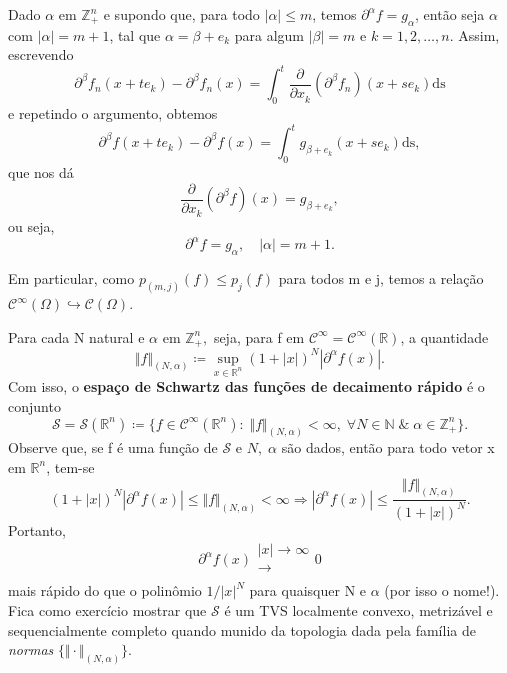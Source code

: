 \documentclass[../distribution_theory_notes.tex]{subfiles}
\begin{document}
\begin{tcolorbox}[
		skin=enhanced,
		title=Observação,
		fonttitle=\bfseries,
		colframe=black,
		colbacktitle=cyan!75!white,
		colback=cyan!15,
		colbacklower=black,
		coltitle=black,
		drop fuzzy shadow,
	]
	Dado \(\alpha \) em \(\mathbb{Z}_{+}^{n}\) e supondo que, para todo \(|\alpha |\leq m\), temos \(\partial^{\alpha }f = g_{\alpha }\), então seja \(\alpha \) com \(|\alpha |=m+1\), tal que \(\alpha = \beta +e_{k}\) para algum \(|\beta |=m\) e \(k = 1,2,\dotsc ,n.\) Assim, escrevendo
	\[
		\partial^{\beta }f_{n}(x+te_{k})-\partial^{\beta }f_{n}(x)=\int_{0}^{t}\frac{\partial^{}}{\partial x_{k}^{}}(\partial^{\beta }f_{n})(x+se_{k}) \mathrm{ds}
	\]
	e repetindo o argumento, obtemos
	\[
		\partial^{\beta }f(x+te_{k})-\partial^{\beta }f(x)=\int_{0}^{t}g_{\beta +e_{k}}(x+se_{k}) \mathrm{ds},
	\]
	que nos dá
	\[
		\frac{\partial^{}}{\partial x_{k}^{}}(\partial^{\beta }f)(x)=g_{\beta+e_{k}},
	\]
	ou seja,
	\[
		\partial^{\alpha }f = g_{\alpha },\quad |\alpha |=m+1.
	\]

	Em particular, como \(p_{(m, j)}(f)\leq p_{j}(f)\) para todos m e j, temos a relação \(\mathcal{C}^{\infty}(\Omega )\hookrightarrow \mathcal{C}(\Omega )\).
\end{tcolorbox}
\begin{example}[O Espaço de Schwartz \(\mathcal{S}=\mathcal{S}(\mathbb{R}^{n})\)]
	Para cada N natural e \(\alpha \) em \(\mathbb{Z}_{+}^{n},\) seja, para f em \(\mathcal{C}^{\infty}=\mathcal{C}^{\infty}(\mathbb{R})\), a quantidade
	\[
		\Vert f \Vert_{(N, \alpha )}\coloneqq \sup_{x\in \mathbb{R}^{n}}(1+|x|)^{N}|\partial^{\alpha }f(x)|.
	\]
	Com isso, o \textbf{espaço de Schwartz das funções de decaimento rápido} é o conjunto
	\[
		\mathcal{S}=\mathcal{S}(\mathbb{R}^{n})\coloneqq \{f\in \mathcal{C}^{\infty}(\mathbb{R}^{n}):\; \Vert f \Vert_{(N, \alpha )}<\infty,\; \forall N\in \mathbb{N}\;\&\; \alpha \in \mathbb{Z}_{+}^{n}\}.
	\]
	Observe que, se f é uma função de \(\mathcal{S}\) e \(N,\; \alpha \) são dados, então para todo vetor x em \(\mathbb{R}^{n}\), tem-se
	\[
		(1+|x|)^{N}|\partial^{\alpha }f(x)|\leq  \Vert f \Vert_{(N, \alpha )}<\infty \Rightarrow |\partial^{\alpha }f(x)|\leq \frac{\Vert f \Vert_{(N, \alpha )}}{(1+|x|)^{N}}.
	\]
	Portanto,
	\[
		\partial^{\alpha }f(x)\substack{|x|\to \infty \\ \rightarrow \\ }0
	\]
	mais rápido do que o polinômio \(1/|x|^{N}\) para quaisquer N e \(\alpha \) (por isso o nome!). Fica como exercício mostrar que \(\mathcal{S}\) é um TVS localmente convexo, metrizável e sequencialmente completo quando munido da topologia dada pela família de \textit{normas} \(\{\Vert \cdot  \Vert_{(N, \alpha )}\}\).
\end{example}
\end{document}
